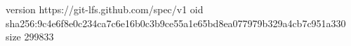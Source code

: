 version https://git-lfs.github.com/spec/v1
oid sha256:9c4e6f8e0c234ca7c6e16b0c3b9ce55a1e65bd8ea077979b329a4cb7c951a330
size 299833
